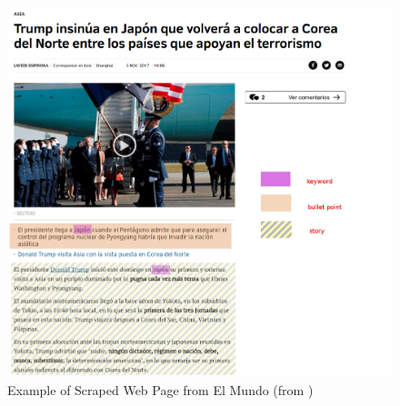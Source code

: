 \documentclass[]{article}
\begin{document}
\begin{center}
\begin{figure}
\includegraphics[width=\linewidth]{media/article.png}
\caption{Example of Scraped Web Page from El Mundo (from \cite{elmundosample})}
\label{fig:article}
\end{figure}
\end{center}
\end{document}

